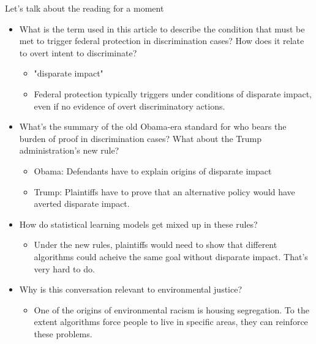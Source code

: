\documentclass[mathserif, aspectratio=169]{beamer}
\begin{document}
\begin{frame}{Let's talk about the reading for a moment}

\begin{itemize}
	\item What is the term used in this article to describe the condition that must be met to trigger federal protection in discrimination cases?  How does it relate to overt intent to discriminate? \pause
	\begin{itemize}
		\item  "disparate impact"
		\item Federal protection typically triggers under conditions of disparate impact, even if no evidence of overt discriminatory actions.  \pause
	\end{itemize}
	\item What's the summary of the old Obama-era standard for who bears the burden of proof in discrimination cases?  What about the Trump administration's new rule? \pause
	\begin{itemize}
		\item Obama: Defendants have to explain origins of disparate impact
		\item Trump: Plaintiffs have to prove that an alternative policy would have averted disparate impact.   \pause
	\end{itemize}
	\item How do statistical learning models get mixed up in these rules? \pause
	\begin{itemize}
			\item Under the new rules, plaintiffs would need to show that different algorithms could acheive the same goal without disparate impact.  That's very hard to do. \pause
	\end{itemize}	
	\item Why is this conversation relevant to environmental justice?   \pause
	\begin{itemize}
		\item One of the origins of environmental racism is housing segregation.  To the extent algorithms force people to live in specific areas, they can reinforce these problems.  
	\end{itemize}
\end{itemize}

\end{frame}
\end{document}
